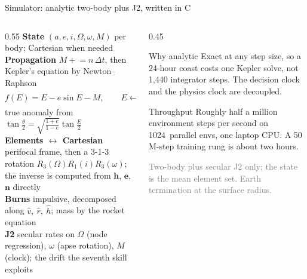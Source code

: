 \documentclass[aspectratio=169,11pt]{beamer}
\newcommand{\nEnvs}{1024}
\begin{document}
\begin{frame}{Simulator: analytic two-body plus J2, written in C}
\begin{columns}[T]
\begin{column}{0.55\textwidth}\footnotesize
\textbf{State} \; $(a, e, i, \Omega, \omega, M)$ per body; Cartesian when needed\\[1.5mm]
\textbf{Propagation} \; $M \mathrel{+}= n\,\Delta t$, then Kepler's equation by Newton--Raphson
\[ f(E)=E-e\sin E-M,\qquad E \leftarrow E-\frac{f}{1-e\cos E} \]
true anomaly from $\tan\frac{\theta}{2}=\sqrt{\tfrac{1+e}{1-e}}\tan\frac{E}{2}$\\[1.5mm]
\textbf{Elements $\leftrightarrow$ Cartesian} \; perifocal frame, then a 3-1-3 rotation $R_3(\Omega)R_1(i)R_3(\omega)$; the inverse is computed from $\mathbf h$, $\mathbf e$, $\mathbf n$ directly\\[1.5mm]
\textbf{Burns} \; impulsive, decomposed along $\hat v,\ \hat r,\ \hat h$; mass by the rocket equation\\[1.5mm]
\textbf{J2} \; secular rates on $\Omega$ (node regression), $\omega$ (apse rotation), $M$ (clock); the drift the seventh skill exploits
\end{column}
\begin{column}{0.45\textwidth}\small
\begin{block}{Why analytic}
Exact at any step size, so a 24-hour coast costs one Kepler solve, not 1,440 integrator steps. The decision clock and the physics clock are decoupled.
\end{block}
\begin{block}{Throughput}
Roughly half a million environment steps per second on \nEnvs\ parallel envs, one laptop CPU. A 50\,M-step training rung is about two hours.
\end{block}
\vspace{1mm}
{\scriptsize\textcolor{grey}{Two-body plus secular J2 only; the state is the mean element set. Earth termination at the surface radius.}}
\end{column}
\end{columns}
\end{frame}
\end{document}
